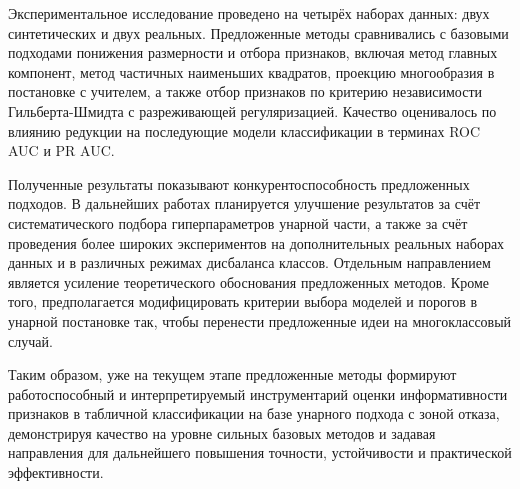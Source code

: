 \documentclass[12pt,a4paper]{article}
\begin{document}
Экспериментальное исследование проведено на четырёх наборах данных: двух синтетических и двух реальных. Предложенные методы сравнивались с базовыми подходами понижения
размерности и отбора признаков, включая метод главных компонент, метод частичных наименьших квадратов,
проекцию многообразия в постановке с учителем, а также отбор признаков по критерию независимости
Гильберта-Шмидта с разреживающей регуляризацией. Качество оценивалось по влиянию редукции на последующие модели
классификации в терминах ROC AUC и PR AUC.

Полученные результаты показывают конкурентоспособность предложенных подходов. 
В дальнейших работах планируется улучшение результатов за счёт систематического подбора гиперпараметров унарной части,
а также за счёт проведения более широких экспериментов на дополнительных реальных наборах данных и в различных режимах дисбаланса классов.
Отдельным направлением является усиление теоретического обоснования предложенных методов.
Кроме того, предполагается модифицировать критерии выбора моделей и порогов в унарной постановке так, чтобы перенести предложенные идеи
на многоклассовый случай.

Таким образом, уже на текущем этапе предложенные методы формируют работоспособный и интерпретируемый инструментарий оценки информативности
признаков в табличной классификации на базе унарного подхода с зоной отказа, демонстрируя качество на уровне сильных базовых методов
и задавая направления для дальнейшего повышения точности, устойчивости и практической эффективности.
\end{document}
